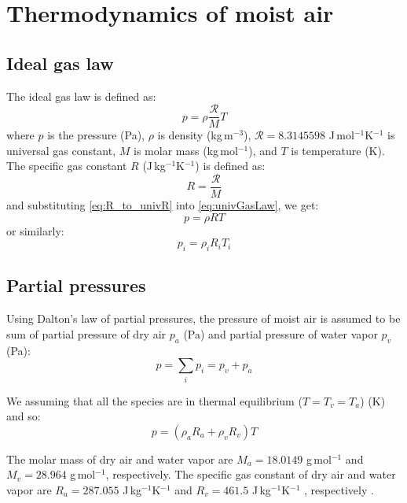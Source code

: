\chapter{Thermodynamics of moist air}
\label{app:thermodynamics}


\section*{Ideal gas law}

The ideal gas law is defined as:
\begin{equation}
p = \rho\frac{\mathcal{R}}{M}T
\label{eq:univGasLaw}
\end{equation}
where $p$ is the pressure (Pa), $\rho$ is density (kg\,m$^{-3}$), $\mathcal{R}=\num{8.3145598}$ J\,mol$^{-1}$K$^{-1}$ is universal gas constant, $M$ is molar mass (kg\,mol$^{-1}$), and $T$ is temperature (K). The specific gas constant $R$ (J\,kg$^{-1}$K$^{-1}$) is defined as:
\begin{equation}
R = \frac{\mathcal{R}}{M}
\label{eq:R_to_univR}
\end{equation}
and substituting \ref{eq:R_to_univR} into \ref{eq:univGasLaw}, we get:
\begin{equation}
p = \rho R T
\label{eq:idealGasLaw}
\end{equation}
or similarly:
\begin{equation}
p_i = \rho_i R_i T_i
\label{eq:idealGasLaw2}
\end{equation}

\section*{Partial pressures}

Using Dalton's law of partial pressures, the pressure of moist air is assumed to be sum of partial pressure of dry air $p_a$ (Pa) and partial pressure of water vapor $p_v$ (Pa):
\begin{equation}
p = \sum_i p_i  = p_v + p_a
\label{eq:dalton}
\end{equation}

We assuming that all the species are in thermal equilibrium ($T = T_v = T_a$) (K) and so:
\begin{equation}
p = \left(\rho_a R_a + \rho_v R_v \right) T
\end{equation}

The molar mass of dry air and water vapor are $M_a = \num{18.0149}$ g\,mol$^{-1}$ and $M_v=\num{28.964}$ g\,mol$^{-1}$, respectively. The specific gas constant of dry air and water vapor are $R_a = \num{287.055}$ J\,kg$^{-1}$K$^{-1}$ and $R_v = \num{461.5}$ J\,kg$^{-1}$K$^{-1}$ , respectively \citep{ASHRAE2013}.

